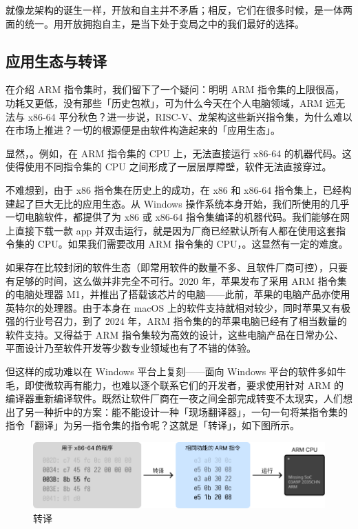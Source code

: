 就像龙架构的诞生一样，开放和自主并不矛盾；相反，它们在很多时候，是一体两面的统一。用开放拥抱自主，是当下处于变局之中的我们最好的选择。

\subsection{应用生态与转译}

在介绍 ARM 指令集时，我们留下了一个疑问：明明 ARM 指令集的上限很高，功耗又更低，没有那些「历史包袱」，可为什么今天在个人电脑领域，ARM 远无法与 x86-64 平分秋色？进一步说，RISC-V、龙架构这些新兴指令集，为什么难以在市场上推进？一切的根源便是由软件构造起来的「应用生态」。

显然，。例如，在 ARM 指令集的 CPU 上，无法直接运行 x86-64 的机器代码。这使得使用不同指令集的 CPU 之间形成了一层层厚障壁，软件无法直接穿过。

不难想到，由于 x86 指令集在历史上的成功，在 x86 和 x86-64 指令集上，已经构建起了巨大无比的应用生态。从 Windows 操作系统本身开始，我们所使用的几乎一切电脑软件，都提供了为 x86 或 x86-64 指令集编译的机器代码。我们能够在网上直接下载一款 app 并双击运行，就是因为厂商已经默认所有人都在使用这套指令集的 CPU。如果我们需要改用 ARM 指令集的 CPU，。这显然有一定的难度。

如果存在比较封闭的软件生态（即常用软件的数量不多、且软件厂商可控），只要有足够的时间，这么做并非完全不可行。2020 年，苹果发布了采用 ARM 指令集的电脑处理器 M1，并推出了搭载该芯片的电脑——此前，苹果的电脑产品亦使用英特尔的处理器。由于本身在 macOS 上的软件支持就相对较少，同时苹果又有极强的行业号召力，到了 2024 年，ARM 指令集的的苹果电脑已经有了相当数量的软件支持。又得益于 ARM 指令集较为高效的设计，这些电脑产品在日常办公、平面设计乃至软件开发等少数专业领域也有了不错的体验。

但这样的成功难以在 Windows 平台上复刻——面向 Windows 平台的软件多如牛毛，即使微软再有能力，也难以逐个联系它们的开发者，要求使用针对 ARM 的编译器重新编译软件。既然让软件厂商在一夜之间全部完成转变不太现实，人们想出了另一种折中的方案：能不能设计一种「现场翻译器」，一句一句将某指令集的指令「翻译」为另一指令集的指令呢？这就是「转译」，如下图所示。

\begin{figure}[htb!]
  \centering
  \includegraphics[width=.85\textwidth]{assets/surpass/Translate.pdf}
  \caption{转译}
  \label{fig:Translate}
\end{figure}

